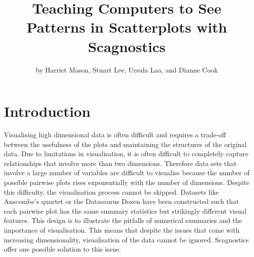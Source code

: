 \title{Teaching Computers to See Patterns in Scatterplots with
Scagnostics}
\author{by Harriet Mason, Stuart Lee, Ursula Laa, and Dianne Cook}

\maketitle


\hypertarget{introduction}{%
\section{Introduction}\label{introduction}}

Visualising high dimensional data is often difficult and requires a
trade-off between the usefulness of the plots and maintaining the
structures of the original data. Due to limitations in visualisation, it
is often difficult to completely capture relationships that involve more
than two dimensions. Therefore data sets that involve a large number of
variables are difficult to visualise because the number of possible
pairwise plots rises exponentially with the number of dimensions.
Despite this difficulty, the visualisation process cannot be skipped.
Datasets like Anscombe's quartet \citep{anscombe} or the Datasaurus
Dozen \citep{datasaurpkg} have been constructed such that each pairwise
plot has the same summary statistics but strikingly different visual
features. This design is to illustrate the pitfalls of numerical
summaries and the importance of visualisation. This means that despite
the issues that come with increasing dimensionality, visualisation of
the data cannot be ignored. Scagnostics offer one possible solution to
this issue.

